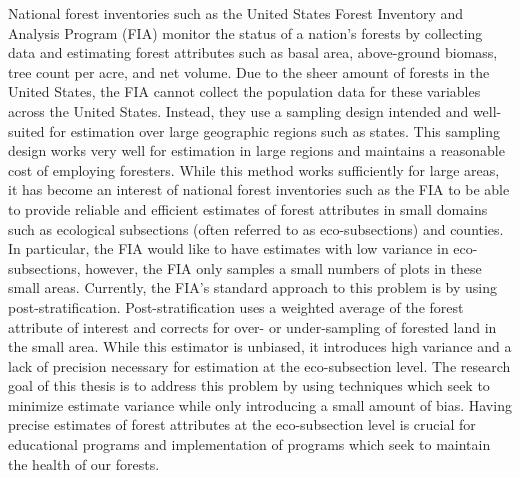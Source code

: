 \documentclass[12pt,twoside]{reedthesis}
\begin{document}
National forest inventories such as the United States Forest Inventory and Analysis Program (FIA) monitor the status of a nation's forests by collecting data and estimating forest attributes such as basal area, above-ground biomass, tree count per acre, and net volume. Due to the sheer amount of forests in the United States, the FIA cannot collect the population data for these variables across the United States. Instead, they use a sampling design intended and well-suited for estimation over large geographic regions such as states. This sampling design works very well for estimation in large regions and maintains a reasonable cost of employing foresters. While this method works sufficiently for large areas, it has become an interest of national forest inventories such as the FIA to be able to provide reliable and efficient estimates of forest attributes in small domains such as ecological subsections (often referred to as eco-subsections) and counties. In particular, the FIA would like to have estimates with low variance in eco-subsections, however, the FIA only samples a small numbers of plots in these small areas. Currently, the FIA's standard approach to this problem is by using post-stratification. Post-stratification uses a weighted average of the forest attribute of interest and corrects for over- or under-sampling of forested land in the small area. While this estimator is unbiased, it introduces high variance and a lack of precision necessary for estimation at the eco-subsection level. The research goal of this thesis is to address this problem by using techniques which seek to minimize estimate variance while only introducing a small amount of bias. Having precise estimates of forest attributes at the eco-subsection level is crucial for educational programs and implementation of programs which seek to maintain the health of our forests.
\end{document}

